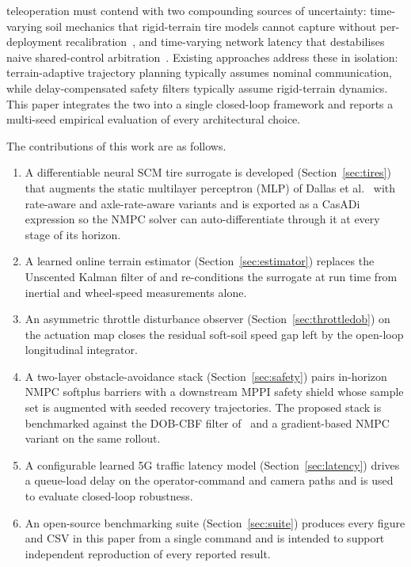 \documentclass[conference,letterpaper,10pt]{IEEEtran}
\begin{document}
 teleoperation must contend with two
compounding sources of uncertainty: time-varying soil mechanics that
rigid-terrain tire models cannot capture without per-deployment
recalibration~\cite{Dallas21,Bekker69}, and time-varying network
latency that destabilises naive shared-control
arbitration~\cite{Choi23,Zhang25}. Existing approaches address these
in isolation: terrain-adaptive trajectory planning typically assumes
nominal communication, while delay-compensated safety filters
typically assume rigid-terrain dynamics. This paper integrates the two
into a single closed-loop framework and reports a multi-seed empirical
evaluation of every architectural choice.

The contributions of this work are as follows.
\begin{enumerate}
  \item A differentiable neural SCM tire surrogate is developed
        (Section~\ref{sec:tires}) that augments the static
        multilayer perceptron (MLP) of Dallas et al.~\cite{Dallas21}
        with rate-aware and axle-rate-aware variants and is exported
        as a CasADi expression so the NMPC solver can
        auto-differentiate through it at every stage of its horizon.
  \item A learned online terrain estimator
        (Section~\ref{sec:estimator}) replaces the Unscented Kalman
        filter of \cite{Dallas21} and re-conditions the surrogate at
        run time from inertial and wheel-speed measurements alone.
  \item An asymmetric throttle disturbance observer
        (Section~\ref{sec:throttledob}) on the actuation map closes
        the residual soft-soil speed gap left by the open-loop
        longitudinal integrator.
  \item A two-layer obstacle-avoidance stack
        (Section~\ref{sec:safety}) pairs in-horizon NMPC softplus
        barriers with a downstream MPPI safety shield whose sample set
        is augmented with seeded recovery trajectories. The proposed
        stack is benchmarked against the DOB-CBF filter
        of~\cite{Zhang25} and a gradient-based NMPC variant on the
        same rollout.
  \item A configurable learned 5G traffic latency model
        (Section~\ref{sec:latency}) drives a queue-load delay on the
        operator-command and camera paths and is used to evaluate
        closed-loop robustness.
  \item An open-source benchmarking suite
        (Section~\ref{sec:suite}) produces every figure and CSV in
        this paper from a single command and is intended to support
        independent reproduction of every reported result.
\end{enumerate}
\end{document}
